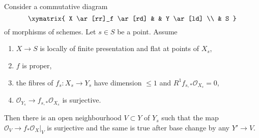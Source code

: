 \begin{lemma}
\label{lemma-h1-fibre-zero-h0-kappa}
Consider a commutative diagram
$$
\xymatrix{
X \ar[rr]_f \ar[rd] & & Y \ar[ld] \\
& S
}
$$
of morphisms of schemes. Let $s \in S$ be a point. Assume
\begin{enumerate}
\item $X \to S$ is locally of finite presentation and flat at
points of $X_s$,
\item $f$ is proper,
\item the fibres of $f_s : X_s \to Y_s$ have dimension $\leq 1$
and $R^1f_{s, *}\mathcal{O}_{X_s} = 0$,
\item $\mathcal{O}_{Y_s} \to f_{s, *}\mathcal{O}_{X_s}$ is surjective.
\end{enumerate}
Then there is an open neighbourhood $V \subset Y$ of $Y_s$ such that
the map $\mathcal{O}_V \to f_*\mathcal{O}_X|_V$ is surjective
and the same is true after base change by any $Y' \to V$.
\end{lemma}

